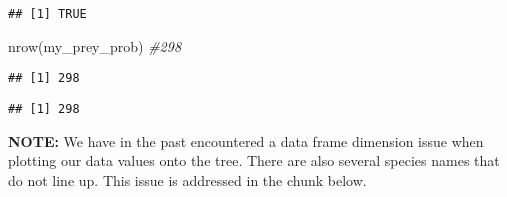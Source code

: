 \documentclass[
]{article}
\newenvironment{Shaded}{\begin{snugshade}}{\end{snugshade}}
\newcommand{\CommentTok}[1]{\textcolor[rgb]{0.56,0.35,0.01}{\textit{#1}}}
\newcommand{\FunctionTok}[1]{\textcolor[rgb]{0.00,0.00,0.00}{#1}}
\newcommand{\NormalTok}[1]{#1}
\newcommand{\OtherTok}[1]{\textcolor[rgb]{0.56,0.35,0.01}{#1}}
\newcommand{\SpecialCharTok}[1]{\textcolor[rgb]{0.00,0.00,0.00}{#1}}
\newcommand{\StringTok}[1]{\textcolor[rgb]{0.31,0.60,0.02}{#1}}
\begin{document}
\begin{Shaded}
\end{Shaded}

\begin{verbatim}
## [1] TRUE
\end{verbatim}

\begin{Shaded}
\begin{Highlighting}[]
\FunctionTok{nrow}\NormalTok{(my\_prey\_prob) }\CommentTok{\#298}
\end{Highlighting}
\end{Shaded}

\begin{verbatim}
## [1] 298
\end{verbatim}

\begin{Shaded}
\end{Shaded}

\begin{verbatim}
## [1] 298
\end{verbatim}

\textbf{NOTE:} We have in the past encountered a data frame dimension
issue when plotting our data values onto the tree. There are also
several species names that do not line up. This issue is addressed in
the chunk below.
\end{document}

